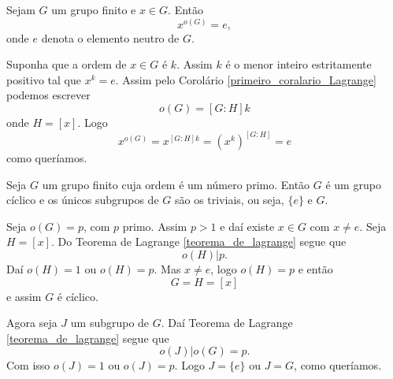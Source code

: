 \begin{corolario}
    Sejam $G$ um grupo finito e $x \in G$. Então
    \[
        x^{o(G)} = e,
    \]
    onde $e$ denota o elemento neutro de $G$.
\end{corolario}
\begin{prova}
    Suponha que a ordem de $x \in G$ é $k$. Assim $k$ é o menor inteiro estritamente positivo tal que $x^k = e$. Assim pelo Corolário \eqref{primeiro_coralario_Lagrange} podemos escrever
    \[
        o(G) = [G : H]k
    \]
    onde $H = [x]$. Logo
    \[
        x^{o(G)} = x^{[G : H]k} = (x^k)^{[G : H]} = e
    \]
    como queríamos.
\end{prova}

\begin{corolario}
    Seja $G$ um grupo finito cuja ordem é um número primo. Então $G$ é um grupo cíclico e os únicos subgrupos de $G$ são os triviais, ou seja, $\{e\}$ e $G$.
\end{corolario}
\begin{prova}
    Seja $o(G) = p$, com $p$ primo. Assim $p > 1$ e daí existe $x \in G$ com $x \ne e$. Seja $H = [x]$. Do Teorema de Lagrange \eqref{teorema_de_lagrange} segue que
    \[
        o(H) | p.
    \]
    Daí $o(H) = 1$ ou $o(H) = p$. Mas $x \ne e$, logo $o(H) = p$ e então
    \[
        G = H = [x]
    \]
    e assim $G$ é cíclico.

    Agora seja $J$ um subgrupo de $G$. Daí Teorema de Lagrange \eqref{teorema_de_lagrange} segue que
    \[
        o(J) | o(G) = p.
    \]
    Com isso $o(J) = 1$ ou $o(J) = p$. Logo $J = \{e\}$ ou $J = G$, como queríamos.

\end{prova}
